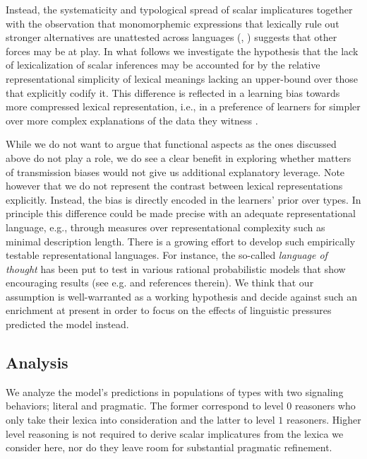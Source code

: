 \documentclass[a4paper]{article}
\begin{document}
Instead, the systematicity and typological spread of scalar implicatures together with the observation that monomorphemic expressions that lexically rule out stronger alternatives are unattested across languages (\citealt[252-267]{horn:1984}, \citealt{horn:1972,traugott:2004,vdAuwera:2010}) suggests that other forces may be at play. In what follows we investigate the hypothesis that the lack of lexicalization of scalar inferences may be accounted for by the relative representational simplicity of lexical meanings lacking an upper-bound over those that explicitly codify it. This difference is reflected in a learning bias towards more compressed lexical representation, i.e., in a preference of learners for simpler over more complex explanations of the data they witness \citep{feldman:2000, chater+vitanyi:2003, piantadosi+etal:2012a, kirby+etal:2015,piantadosi+etal:underreview}. 

While we do not want to argue that functional aspects as the ones discussed above do not play a role, we do see a clear benefit in exploring whether matters of transmission biases would not give us additional explanatory leverage. Note however that we do not represent the contrast between lexical representations explicitly. Instead, the bias is directly encoded in the learners' prior over types. In principle this difference could be made precise with an adequate representational language, e.g., through measures over representational complexity such as minimal description length.  There is a growing effort to develop such empirically  testable  representational  languages. For  instance, the so-called {\em language of thought} has been put to test in various rational probabilistic models that show encouraging results (see e.g. \citealt{katz+etal:2008, piantadosi+etal:underreview, piantadosi+etal:2012a} and references therein). We think that our assumption is well-warranted as a working hypothesis and decide against such an enrichment at present in order to focus on the effects of linguistic pressures predicted the model instead.




\subsection{Analysis}
We analyze the model's predictions in populations of types with two signaling behaviors; literal and pragmatic. The former correspond to level $0$ reasoners who only take their lexica into consideration and the latter to level $1$ reasoners. Higher level reasoning is not required to derive scalar implicatures from the lexica we consider here, nor do they leave room for substantial pragmatic refinement.
\end{document}
